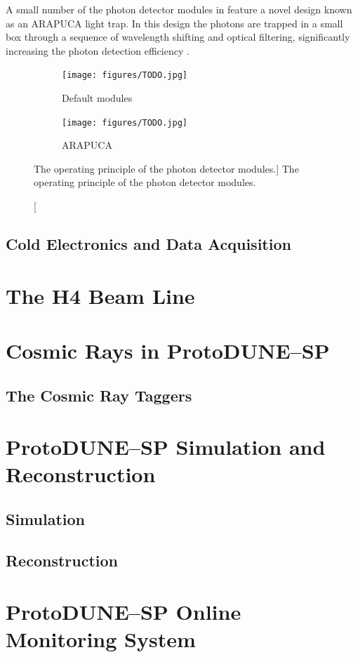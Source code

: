 A small number  of the photon detector modules in
\protodune{} feature a novel design known as an ARAPUCA light trap. In this
design the photons are trapped in a small box through a sequence of wavelength
shifting and optical filtering, significantly increasing the photon detection
efficiency \cite{Segreto:2018jdx}. 



\begin{figure}

	\centering

	\begin{subfigure}[b]{0.49\textwidth}
		\texttt{[image: figures/TODO.jpg]}
		\caption{Default modules}
		\label{fig:pd_module}
	\end{subfigure}
	\hfill
	\begin{subfigure}[b]{0.49\textwidth}
		\texttt{[image: figures/TODO.jpg]}
		\caption{ARAPUCA}
		\label{fig:arapuca_module}
	\end{subfigure}

	\caption
	[The operating principle of the \protodune{} photon detector modules.]
	{The operating principle of the \protodune{} photon detector modules.}

	\label{fig:pdsp_tpc}

\end{figure}


\subsection{Cold Electronics and Data Acquisition}

\section{The H4 Beam Line} \label{sec:h4}


\section{Cosmic Rays in ProtoDUNE--SP} \label{sec:pdsp_cosmic}
\subsection{The Cosmic Ray Taggers}



\section{ProtoDUNE--SP Simulation and Reconstruction} \label{sec:pdsp_sim_reco}

\subsection{Simulation}

\subsection{Reconstruction}

\section{ProtoDUNE--SP Online Monitoring System} \label{sec:pdsp_om}

